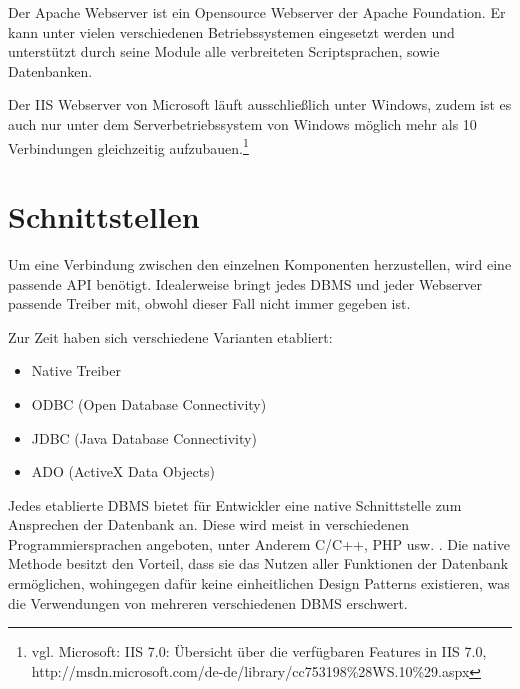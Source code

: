 Der Apache Webserver ist ein Opensource Webserver der Apache Foundation.
Er kann unter vielen verschiedenen Betriebssystemen eingesetzt werden und unterstützt durch seine Module alle verbreiteten Scriptsprachen, sowie Datenbanken.

Der IIS Webserver von Microsoft läuft ausschließlich unter Windows, zudem ist es auch nur unter dem Serverbetriebssystem von Windows möglich mehr als 10 Verbindungen gleichzeitig aufzubauen.\footnote{vgl. Microsoft: IIS 7.0: Übersicht über die verfügbaren Features in IIS 7.0, http://msdn.microsoft.com/de-de/library/cc753198\%28WS.10\%29.aspx}

\section{Schnittstellen}
\label{sec:schnittstellen}


Um eine Verbindung zwischen den einzelnen Komponenten herzustellen, wird eine passende API benötigt.
Idealerweise bringt jedes DBMS und jeder Webserver passende Treiber mit, obwohl dieser Fall nicht immer gegeben ist.

Zur Zeit haben sich verschiedene Varianten etabliert:

\begin{itemize}
\item Native Treiber
\item ODBC (Open Database Connectivity)
\item JDBC (Java Database Connectivity)
\item ADO (ActiveX Data Objects)
\end{itemize}

Jedes etablierte DBMS bietet für Entwickler eine native Schnittstelle zum Ansprechen der Datenbank an.
Diese wird meist in verschiedenen Programmiersprachen angeboten, unter Anderem C/C++, PHP usw. .
Die native Methode besitzt den Vorteil, dass sie das Nutzen aller Funktionen der Datenbank ermöglichen, wohingegen dafür keine einheitlichen Design Patterns existieren, was die Verwendungen von mehreren
verschiedenen DBMS erschwert.

